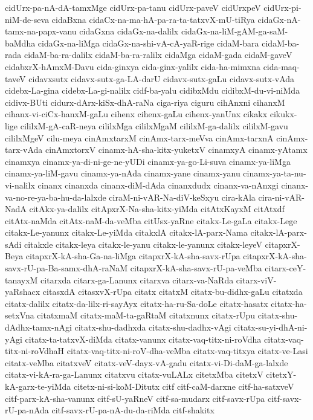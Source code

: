 {cidUrx-pa-nA-dA-tamxMge
cidUrx-pa-tanu
cidUrx-paveV
cidUrxpeV
cidUrx-pi-niM-de-seva
cidaBxna
cidaCx-na-ma-hA-pa-ra-ta-tatxvX-mU-tiRya
cidaGx-nA-tamx-na-papx-vanu
cidaGxna
cidaGx-na-dalilx
cidaGx-na-liM-gAM-ga-saM-baMdha
cidaGx-na-liMga
cidaGx-na-shi-vA-cA-yaR-rige
cidaM-bara
cidaM-ba-rada
cidaM-ba-ra-dalilx
cidaM-ba-ra-ralilx
cidaMga
cidaM-gada
cidaM-gaveV
cidabxrX-hAmxM-Davu
cida-ginxya
cida-ginx-yalilx
cida-ha-mimxna
cida-maq-taveV
cidavxsutx
cidavx-sutx-ga-LA-darU
cidavx-sutx-gaLu
cidavx-sutx-vAda
cidebx-La-gina
cidebx-La-gi-nalilx
cidf-ba-yalu
cidibxMdu
cidibxM-du-vi-niMda
cidivx-BUti
cidurx-dArx-kiSx-dhA-raNa
ciga-riya
ciguru
cihAnxni
cihanxM
cihanx-vi-ciCx-hanxM-gaLu
cihenx
cihenx-gaLu
cihenx-yanUnx
cikakx
cikukx-lige
cililxM-gA-caR-neya
cililxMga
cililxMgaM
cililxM-ga-dalilx
cililxM-gavu
cililxMgeV
cilu-meya
cinAmxtarxM
cinAmx-tarx-meVva
cinAmx-tarxnA
cinAmx-tarx-vAda
cinAmxtorxV
cinamx-hA-sha-kitx-yuketxV
cinamxyA
cinamx-yAtamx
cinamxya
cinamx-ya-di-ni-ge-ne-yUDi
cinamx-ya-go-Li-suva
cinamx-ya-liMga
cinamx-ya-liM-gavu
cinamx-ya-nAda
cinamx-yane
cinamx-yanu
cinamx-ya-ta-nu-vi-nalilx
cinanx
cinanxda
cinanx-diM-dAda
cinanxdudx
cinanx-va-nAnxgi
cinanx-va-no-re-ya-ba-hu-da-lalxde
ciraM-ni-vAR-Na-diV-keSxyu
cira-kAla
cira-ni-vAR-NadA
citAkx-ya-dalilx
citApxrX-Na-sha-kitx-yiMda
citAtxKayxM
citAtxdf
citAtx-naMda
citAtx-naM-da-veMba
citUsx-yaRne
citakx-Le-gaLa
citakx-Lege
citakx-Le-yanunx
citakx-Le-yiMda
citakxlA
citakx-lA-parx-Nama
citakx-lA-parx-sAdi
citakxle
citakx-leya
citakx-le-yanu
citakx-le-yanunx
citakx-leyeV
citapxrX-Beya
citapxrX-kA-sha-Ga-na-liMga
citapxrX-kA-sha-savx-rUpa
citapxrX-kA-sha-savx-rU-pa-Ba-samx-dhA-raNaM
citapxrX-kA-sha-savx-rU-pa-veMba
citarx-ceY-tanayxM
citarxda
citarx-ga-Lanunx
citarxva
citarx-va-NaRda
citarx-viV-yaRshacx
citasxdA
citasxvX-rUpa
citatx
citatxM
citatx-bu-didhx-gaLu
citatxda
citatx-dalilx
citatx-da-lilx-ri-sayAyx
citatx-ha-ru-Sa-doLe
citatx-hasatx
citatx-ha-setxVna
citatxmaM
citatx-maM-ta-gaRtaM
citatxnunx
citatx-rUpu
citatx-shu-dAdhx-tamx-nAgi
citatx-shu-dadhxda
citatx-shu-dadhx-vAgi
citatx-su-yi-dhA-ni-yAgi
citatx-ta-tatxvX-diMda
citatx-vanunx
citatx-vaq-titx-ni-roVdha
citatx-vaq-titx-ni-roVdhaH
citatx-vaq-titx-ni-roV-dha-veMba
citatx-vaq-titxya
citatx-ve-Lasi
citatx-veMba
citatxveV
citatx-veV-dayx-vA-gadu
citatx-vi-Di-daM-ga-lalxde
citatx-vi-kA-ra-ga-Lanunx
citatxvu
citatx-vuLALx
citetxMba
citetxV
citetxY-kA-garx-te-yiMda
citetx-ni-si-koM-Ditutx
citf
citf-caM-darxne
citf-ha-satxveV
citf-parx-kA-sha-vanunx
citf-sU-yaRneV
citf-sa-mudarx
citf-savx-rUpa
citf-savx-rU-pa-nAda
citf-savx-rU-pa-nA-du-da-riMda
citf-shakitx
}
